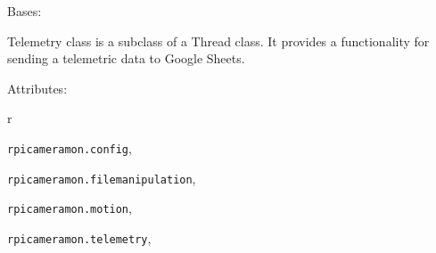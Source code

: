 \documentclass[letterpaper,10pt,english]{sphinxmanual}
\begin{document}
\begin{fulllineitems}
\label{rpicameramon:rpicameramon.telemetry.TelemetrySender}
Bases: 

Telemetry class is a subclass of a Thread class.
It provides a functionality for sending a telemetric data to
Google Sheets.

Attributes:

\begin{fulllineitems}
\label{rpicameramon:rpicameramon.telemetry.TelemetrySender.getTelemetry}
\end{fulllineitems}


\begin{fulllineitems}
\label{rpicameramon:rpicameramon.telemetry.TelemetrySender.run}
\end{fulllineitems}


\end{fulllineitems}



\renewcommand{\indexname}{Python Module Index}
\begin{theindex}
\def\bigletter#1{{\Large\sffamily#1}\nopagebreak\vspace{1mm}}
\bigletter{r}
\item {\texttt{rpicameramon.config}}, \pageref{rpicameramon:module-rpicameramon.config}
\item {\texttt{rpicameramon.filemanipulation}}, \pageref{rpicameramon:module-rpicameramon.filemanipulation}
\item {\texttt{rpicameramon.motion}}, \pageref{rpicameramon:module-rpicameramon.motion}
\item {\texttt{rpicameramon.telemetry}}, \pageref{rpicameramon:module-rpicameramon.telemetry}
\end{theindex}

\renewcommand{\indexname}{Index}
\printindex
\end{document}
